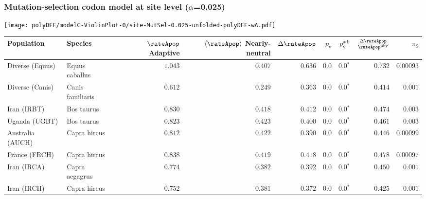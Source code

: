\subsubsection*{Mutation-selection codon model at site level ($\alpha$=0.025)}
\begin{center}
    \texttt{[image: polyDFE/modelC-ViolinPlot-0/site-MutSel-0.025-unfolded-polyDFE-wA.pdf]}
    \begin{adjustbox}{width = 1\textwidth}
        \begin{tabular}{|l|l|r|r|r|r|r|r|r|}
            \toprule
            Population & Species & \specialcell{$\rateApop$ \\ Adaptive}                & \specialcell{$\left< \rateApop \right>$ \\ Nearly-neutral}                & $\Delta \rateApop $    & $p_{\mathrm{v}}$ & $p_{\mathrm{v}}^{\mathrm{adj}}$ & $\frac{\Delta\rateApop}{\rateApop^{\mathrm{phy}}}$ & $\pi_{\textrm{S}}$    \\
            \midrule
            Diverse (Equus)                    & Equus caballus          & $ 1.043$ & $ 0.407$ & $ 0.636$ & $0.0$    & $\bm{0.0{^*}}$    & $ 0.732$ & $0.00093$  \\
            Diverse (Canis)                  & Canis familiaris          & $ 0.612$ & $ 0.249$ & $ 0.363$ & $0.0$    & $\bm{0.0{^*}}$    & $ 0.414$ & $ 0.001$ \\
            Iran (IRBT)               & Bos taurus        & $ 0.830$ & $ 0.418$ & $ 0.412$ & $0.0$    & $\bm{0.0{^*}}$    & $ 0.474$ & $ 0.003$ \\
            Uganda (UGBT)                  & Bos taurus        & $ 0.823$ & $ 0.423$ & $ 0.400$ & $0.0$    & $\bm{0.0{^*}}$    & $ 0.461$ & $ 0.003$ \\
            Australia (AUCH)                    & Capra hircus      & $ 0.812$ & $ 0.422$ & $ 0.390$ & $0.0$    & $\bm{0.0{^*}}$    & $ 0.446$ & $0.00099$ \\
            France (FRCH)                    & Capra hircus        & $ 0.838$ & $ 0.419$ & $ 0.418$ & $0.0$    & $\bm{0.0{^*}}$    & $ 0.478$ & $0.00097$ \\
            Iran (IRCA)                   & Capra aegagrus        & $ 0.774$ & $ 0.382$ & $ 0.392$ & $0.0$    & $\bm{0.0{^*}}$    & $ 0.450$ & $ 0.001$ \\
            Iran (IRCH)                 & Capra hircus        & $ 0.752$ & $ 0.381$ & $ 0.372$ & $0.0$    & $\bm{0.0{^*}}$    & $ 0.425$ & $ 0.001$ \\

\end{tabular}
\end{adjustbox}
\end{center}

